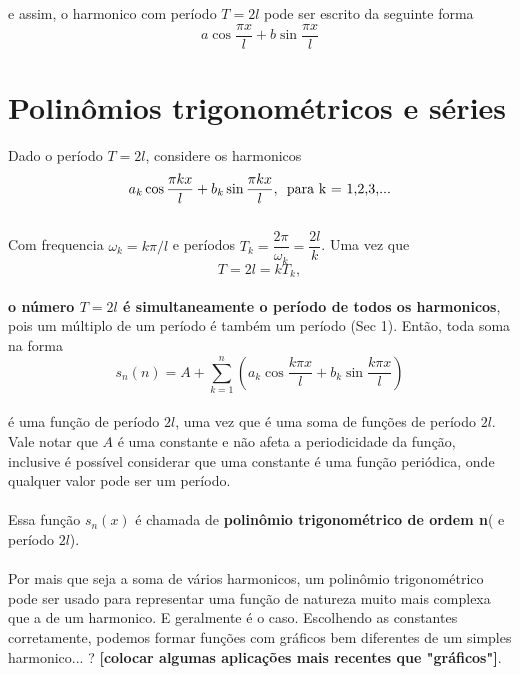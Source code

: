 \documentclass{article}
\begin{document}
e assim, o harmonico com período $T=2l$ pode ser escrito da seguinte forma\\
\begin{equation}
    a\cos{\dfrac{\pi x}{l}} + b\sin{\dfrac{\pi x}{l}}
\end{equation}

\section{Polinômios trigonométricos e séries}
Dado o período $T=2l$, considere os harmonicos\\
\begin{equation}
    a_k\cos{\dfrac{\pi kx}{l}} + b_k\sin{\dfrac{\pi kx}{l}},\text{\hspace{5pt}para k = 1,2,3,...}
\end{equation}
\\
Com frequencia $\omega_k = k\pi/l$ e períodos $T_k = \dfrac{2\pi}{\omega_k} = \dfrac{2l}{k}$. 
Uma vez que 
\begin{equation}
    T = 2l = kT_k,
\end{equation}  
\\
\textbf{o número $T=2l$ é simultaneamente o período de todos os harmonicos},
pois um múltiplo de um período é também um período (Sec 1). Então, toda soma na 
forma\\
\begin{equation}
    s_n(n) = A + \sum\limits_{k=1}^{n}(a_k\cos{\dfrac{k\pi x}{l} + b_k\sin{\dfrac{k\pi x}{l}}})
\end{equation}
\\
é uma função de período $2l$, uma vez que é uma soma de funções de período 
$2l$. Vale notar que $A$ é uma constante e não afeta a periodicidade da função,
inclusive é possível considerar que uma constante é uma função periódica, onde 
qualquer valor pode ser um período.\\
\\
Essa função $s_n(x)$ é chamada  de \textbf{polinômio trigonométrico de ordem n}(
e período $2l$).\\
\\
Por mais que seja a soma de vários harmonicos, um polinômio trigonométrico pode 
ser usado para representar uma função de natureza muito mais complexa que a 
de um harmonico. E geralmente é o caso. Escolhendo as constantes corretamente,
podemos formar funções com gráficos bem diferentes de um simples harmonico... ?
\textbf{[colocar algumas aplicações mais recentes que "gráficos"]}.
\\
\end{document}
